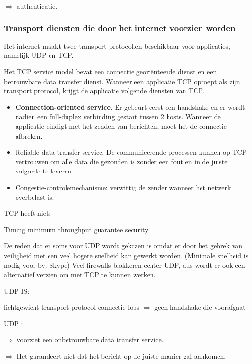 \noindent $\Rightarrow$ authenticatie.

\subsubsection{Transport diensten die door het internet voorzien worden}

Het internet maakt twee transport protocollen beschikbaar voor applicaties, namelijk UDP en TCP.


Het TCP service model bevat een connectie georiënteerde dienst en een betrouwbare data transfer dienst. Wanneer een applicatie TCP oproept als zijn transport protocol, krijgt de applicatie volgende diensten van TCP.
\begin{itemize}
    \item \textbf{Connection-oriented service}. 
    Er gebeurt eerst een handshake en er wordt nadien een full-duplex verbinding gestart tussen 2 hosts. Wanneer de applicatie eindigt met het zenden van berichten, moet het de connectie afbreken.
    \item Reliable data transfer service. De communicerende processen kunnen op TCP vertrouwen om alle data die gezonden is zonder een fout en in de juiste volgorde te leveren.
    \item Congestie-controlemechanisme: verwittig de zender wanneer het netwerk overbelast is.
\end{itemize}

\noindent TCP heeft niet:

\bi
\itf Timing
\itf minimum throughput guarantee
\itf security
\ei


De reden dat er soms voor UDP wordt gekozen is omdat er door het gebrek van veiligheid met een veel hogere snelheid kan gewerkt worden. (Minimale snelheid is nodig voor bv. Skype) Veel firewalls blokkeren echter UDP, dus wordt er ook een alternatief verzien om met TCP te kunnen werken.

\noindent UDP IS:

\bi
\itf lichtgewicht transport protocol
\itf connectie-loos $\Rightarrow$ geen handshake die voorafgaat 
\ei

\noindent UDP :

\noindent $\Rightarrow$ voorziet een onbetrouwbare data transfer service.

\noindent $\Rightarrow$ Het garandeert niet dat het bericht op de juiste manier zal aankomen.


